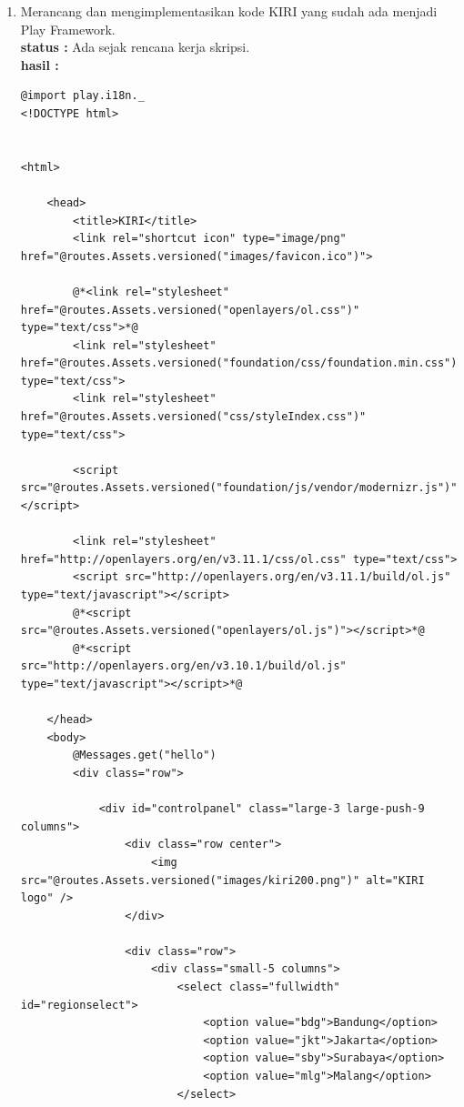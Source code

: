 \documentclass[a4paper,twoside]{article}
\begin{document}
\begin{enumerate}
    \item Merancang dan mengimplementasikan kode KIRI yang sudah ada menjadi Play Framework.\\
    {\bf status :} Ada sejak rencana kerja skripsi.\\
    {\bf hasil :}    
    \begin{lstlisting}[caption=Template \textit{view} pada Play Framework]
@import play.i18n._
<!DOCTYPE html>


<html>

    <head>
        <title>KIRI</title>
        <link rel="shortcut icon" type="image/png" href="@routes.Assets.versioned("images/favicon.ico")">

        @*<link rel="stylesheet" href="@routes.Assets.versioned("openlayers/ol.css")" type="text/css">*@
        <link rel="stylesheet" href="@routes.Assets.versioned("foundation/css/foundation.min.css")" type="text/css">
        <link rel="stylesheet" href="@routes.Assets.versioned("css/styleIndex.css")" type="text/css">

        <script src="@routes.Assets.versioned("foundation/js/vendor/modernizr.js")"></script>

        <link rel="stylesheet" href="http://openlayers.org/en/v3.11.1/css/ol.css" type="text/css">
        <script src="http://openlayers.org/en/v3.11.1/build/ol.js" type="text/javascript"></script>
        @*<script src="@routes.Assets.versioned("openlayers/ol.js")"></script>*@
        @*<script src="http://openlayers.org/en/v3.10.1/build/ol.js" type="text/javascript"></script>*@

    </head>
    <body>
        @Messages.get("hello")
        <div class="row">

            <div id="controlpanel" class="large-3 large-push-9 columns">
                <div class="row center">
                    <img src="@routes.Assets.versioned("images/kiri200.png")" alt="KIRI logo" />
                </div>

                <div class="row">
                    <div class="small-5 columns">
                        <select class="fullwidth" id="regionselect">
                            <option value="bdg">Bandung</option>
                            <option value="jkt">Jakarta</option>
                            <option value="sby">Surabaya</option>
                            <option value="mlg">Malang</option>
                        </select>


\end{lstlisting}
\end{enumerate}
\end{document}
